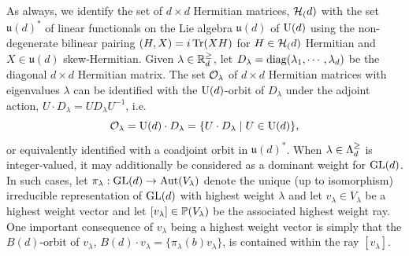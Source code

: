 \documentclass[notitlepage, 10pt]{article}
\begin{document}
As always, we identify the set of $d\times d$ Hermitian matrices, $\mathcal H_{(}d)$ with the set $\mathfrak u(d)^{*}$ of linear functionals on the Lie algebra $\mathfrak u(d)$ of $\operatorname{U}(d)$ using the non-degenerate bilinear pairing $(H, X) = i \operatorname{Tr}(XH)$ for $H \in \mathcal H_{(}d)$ Hermitian and $X \in \mathfrak u(d)$ skew-Hermitian.
Given $\lambda \in \mathbb R^{\geq}_{d}$, let $D_{\lambda} = \operatorname{diag}(\lambda_1, \cdots, \lambda_d)$ be the diagonal $d \times d$ Hermitian matrix.
The set $\mathcal O_{\lambda}$ of $d \times d$ Hermitian matrices with eigenvalues $\lambda$ can be identified with the $\operatorname{U}(d)$-orbit of $D_{\lambda}$ under the adjoint action, $U\cdot D_{\lambda} = U D_{\lambda} U^{-1}$, i.e.
\begin{equation}
    \mathcal O_{\lambda} = \operatorname{U}(d) \cdot D_{\lambda} = \{ U \cdot D_{\lambda} \mid U \in \operatorname{U}(d)\},
\end{equation}
or equivalently identified with a coadjoint orbit in $\mathfrak u(d)^{*}$.
When $\lambda \in \Lambda^{\geq}_{d}$ is integer-valued, it may additionally be considered as a dominant weight for $\operatorname{GL}(d)$.
In such cases, let $\pi_{\lambda} : \operatorname{GL}(d) \to \operatorname{Aut}(V_{\lambda})$\footnotemark{} denote the unique (up to isomorphism) irreducible representation of $\operatorname{GL}(d)$ with highest weight $\lambda$ and let $v_{\lambda} \in V_{\lambda}$ be a highest weight vector and let $[v_{\lambda}] \in \operatorname{\mathbb P}(V_{\lambda})$ be the associated highest weight ray.
%
One important consequence of $v_{\lambda}$ being a highest weight vector is simply that the $B(d)$-orbit of $v_{\lambda}$, $B(d) \cdot v_{\lambda} = \{ \pi_{\lambda}(b) v_{\lambda} \}$, is contained within the ray $[v_{\lambda}]$.
\end{document}
